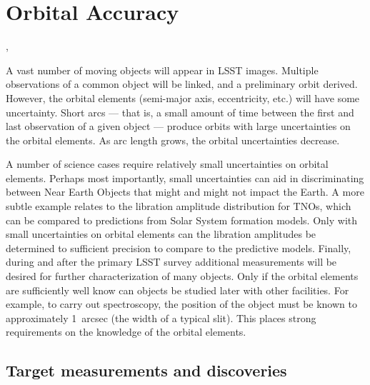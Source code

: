 %
%

\section{Orbital Accuracy}
\def\secname{\chpname:orbits}\label{sec:\secname}

,

A vast number of moving objects will appear in LSST images. Multiple
observations of a common object will be linked, and a preliminary orbit
derived. However, the orbital elements (semi-major axis, eccentricity,
etc.) will have some uncertainty. Short arcs --- that is, a small amount
of time between the first and last observation of a given object ---
produce orbits with large uncertainties on the orbital elements. As arc
length grows, the orbital uncertainties decrease.

A number of science cases require relatively small uncertainties on
orbital elements. Perhaps most importantly, small uncertainties can aid
in discriminating between Near Earth Objects that might and might not
impact the Earth. A more subtle example relates to the libration
amplitude distribution for TNOs, which can be compared to predictions
from Solar System formation models. Only with small uncertainties on
orbital elements can the libration amplitudes be determined to
sufficient precision to compare to the predictive models. Finally,
during and after the primary LSST survey additional measurements will be
desired for further characterization of many objects. Only if the
orbital elements are sufficiently well know can objects be studied later
with other facilities. For example, to carry out spectroscopy, the
position of the object must be known to approximately 1~arcsec (the
width of a typical slit). This places strong requirements on the
knowledge of the orbital elements.



\subsection{Target measurements and discoveries}
\label{sec:\secname:targets}

